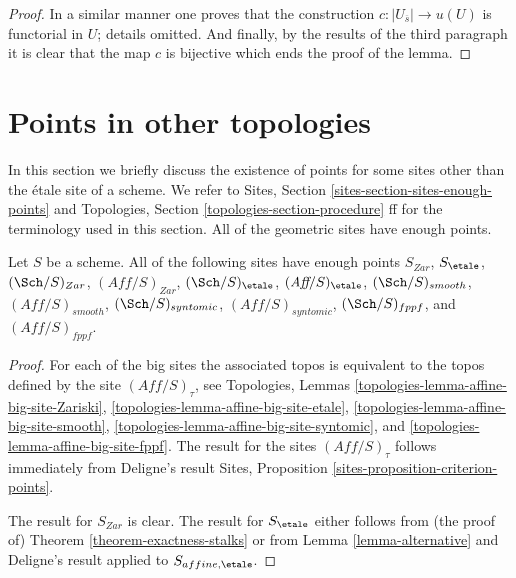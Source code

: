 \begin{proof}
\medskip\noindent
In a similar manner one proves that the construction
$c : |U_{\overline{s}}| \to u(U)$ is functorial in $U$;
details omitted. And finally, by the results of the
third paragraph it is clear that the map $c$ is bijective
which ends the proof of the lemma.
\end{proof}







\section{Points in other topologies}
\label{section-points-topologies}

\noindent
In this section we briefly discuss the existence of points for some
sites other than the \'etale site of a scheme. We refer to
Sites, Section \ref{sites-section-sites-enough-points}
and
Topologies, Section \ref{topologies-section-procedure} ff
for the terminology used in this section.
All of the geometric sites have enough points.

\begin{lemma}
\label{lemma-points-fppf}
Let $S$ be a scheme. All of the following sites have enough points
$S_{Zar}$, $S_\etale$,
$(\Sch/S)_{Zar}$, $(\textit{Aff}/S)_{Zar}$,
$(\Sch/S)_\etale$, $(\textit{Aff}/S)_\etale$,
$(\Sch/S)_{smooth}$, $(\textit{Aff}/S)_{smooth}$,
$(\Sch/S)_{syntomic}$, $(\textit{Aff}/S)_{syntomic}$,
$(\Sch/S)_{fppf}$, and $(\textit{Aff}/S)_{fppf}$.
\end{lemma}

\begin{proof}
For each of the big sites the associated topos is equivalent to the
topos defined by the site $(\textit{Aff}/S)_\tau$, see
Topologies, Lemmas \ref{topologies-lemma-affine-big-site-Zariski},
\ref{topologies-lemma-affine-big-site-etale},
\ref{topologies-lemma-affine-big-site-smooth},
\ref{topologies-lemma-affine-big-site-syntomic}, and
\ref{topologies-lemma-affine-big-site-fppf}.
The result for the sites $(\textit{Aff}/S)_\tau$ follows immediately
from Deligne's result
Sites, Proposition \ref{sites-proposition-criterion-points}.

\medskip\noindent
The result for $S_{Zar}$ is clear. The result for $S_\etale$
either follows from (the proof of)
Theorem \ref{theorem-exactness-stalks}
or from
Lemma \ref{lemma-alternative}
and Deligne's result applied to $S_{affine, \etale}$.
\end{proof}

